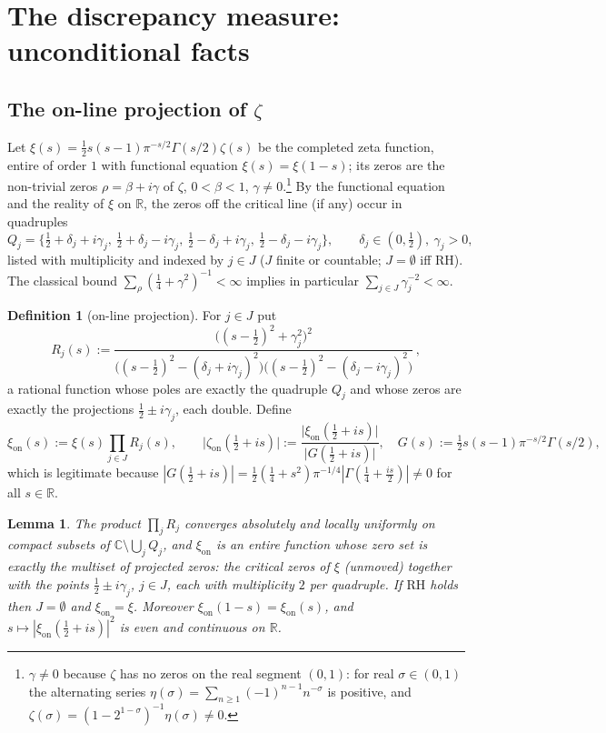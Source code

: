 \documentclass[11pt]{amsart}
\newtheorem{lemma}[theorem]{Lemma}
\theoremstyle{definition}
\newtheorem{definition}[theorem]{Definition}
\theoremstyle{remark}
\newcommand{\RH}{\mathrm{RH}}
\newcommand{\bbR}{\mathbb{R}}
\newcommand{\bbC}{\mathbb{C}}
\newcommand{\zon}{\zeta_{\mathrm{on}}}
\newcommand{\xon}{\xi_{\mathrm{on}}}
\begin{document}
\section{The discrepancy measure: unconditional facts}
\label{sec:facts}

\subsection{The on-line projection of \texorpdfstring{$\zeta$}{zeta}}
Let $\xi(s)=\tfrac12s(s-1)\pi^{-s/2}\Gamma(s/2)\zeta(s)$ be the completed
zeta function, entire of order $1$ with functional equation
$\xi(s)=\xi(1-s)$; its zeros are the non-trivial zeros $\rho=\beta+i\gamma$
of $\zeta$, $0<\beta<1$, $\gamma\neq0$.\footnote{$\gamma\neq0$ because
$\zeta$ has no zeros on the real segment $(0,1)$: for real
$\sigma\in(0,1)$ the alternating series
$\eta(\sigma)=\sum_{n\ge1}(-1)^{n-1}n^{-\sigma}$ is positive, and
$\zeta(\sigma)=(1-2^{1-\sigma})^{-1}\eta(\sigma)\neq0$.} By the functional
equation and the reality of $\xi$ on $\bbR$, the zeros off the critical line
(if any) occur in quadruples
\[
Q_j=\bigl\{\tfrac12+\delta_j+i\gamma_j,\ \tfrac12+\delta_j-i\gamma_j,\
\tfrac12-\delta_j+i\gamma_j,\ \tfrac12-\delta_j-i\gamma_j\bigr\},
\qquad \delta_j\in(0,\tfrac12),\ \gamma_j>0,
\]
listed with multiplicity and indexed by $j\in J$ ($J$ finite or countable;
$J=\emptyset$ iff RH). The classical bound
$\sum_\rho(\tfrac14+\gamma^{2})^{-1}<\infty$ \cite[\S2.12]{Titchmarsh}
implies in particular $\sum_{j\in J}\gamma_j^{-2}<\infty$.

\begin{definition}[on-line projection]\label{def:on}
For $j\in J$ put
\[
R_j(s):=
\frac{\bigl((s-\tfrac12)^{2}+\gamma_j^{2}\bigr)^{2}}
{\bigl((s-\tfrac12)^{2}-(\delta_j+i\gamma_j)^{2}\bigr)
 \bigl((s-\tfrac12)^{2}-(\delta_j-i\gamma_j)^{2}\bigr)}\,,
\]
a rational function whose poles are exactly the quadruple $Q_j$ and whose
zeros are exactly the projections $\tfrac12\pm i\gamma_j$, each double.
Define
\[
\xon(s):=\xi(s)\prod_{j\in J}R_j(s),
\qquad
\bigl|\zon(\tfrac12+is)\bigr|
:=\frac{\bigl|\xon(\tfrac12+is)\bigr|}{\bigl|G(\tfrac12+is)\bigr|},
\quad G(s):=\tfrac12s(s-1)\pi^{-s/2}\Gamma(s/2),
\]
which is legitimate because
$|G(\tfrac12+is)|=\tfrac12(\tfrac14+s^{2})\pi^{-1/4}
|\Gamma(\tfrac14+\tfrac{is}{2})|\neq0$ for all $s\in\bbR$.
\end{definition}

\begin{lemma}\label{lem:onentire}
The product $\prod_{j}R_j$ converges absolutely and locally uniformly on
compact subsets of $\bbC\setminus\bigcup_jQ_j$, and $\xon$ is an entire
function whose zero set is exactly the multiset of projected zeros: the
critical zeros of $\xi$ (unmoved) together with the points
$\tfrac12\pm i\gamma_j$, $j\in J$, each with multiplicity $2$ per quadruple.
If $\RH$ holds then $J=\emptyset$ and $\xon=\xi$. Moreover
$\xon(1-s)=\xon(s)$, and $s\mapsto|\xon(\tfrac12+is)|^{2}$ is even and
continuous on $\bbR$.
\end{lemma}
\end{document}
